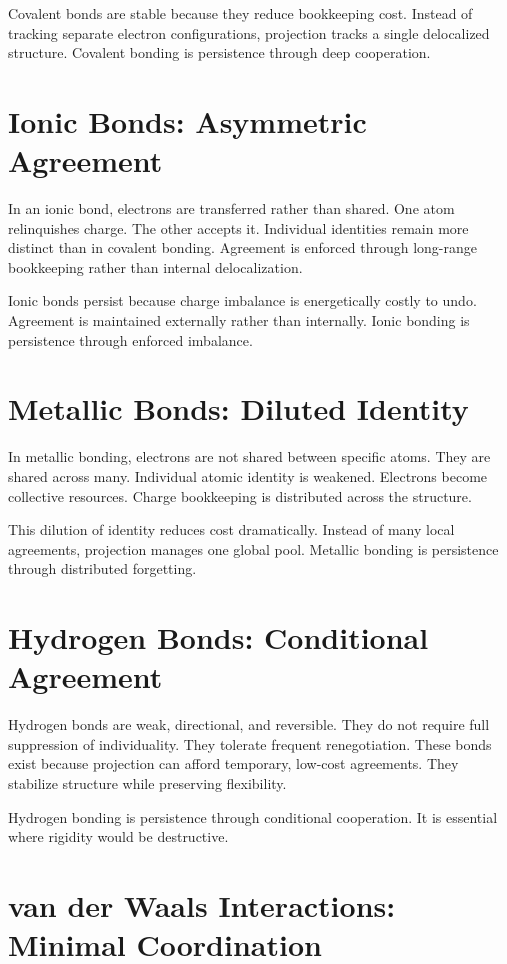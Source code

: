 \documentclass[11pt,twoside,openright]{book}
\begin{document}
Covalent bonds are stable because they reduce bookkeeping cost. Instead of tracking separate electron configurations, projection tracks a single delocalized structure. Covalent bonding is persistence through deep cooperation.

\section*{Ionic Bonds: Asymmetric Agreement}

In an ionic bond, electrons are transferred rather than shared. One atom relinquishes charge. The other accepts it. Individual identities remain more distinct than in covalent bonding. Agreement is enforced through long-range bookkeeping rather than internal delocalization.

Ionic bonds persist because charge imbalance is energetically costly to undo. Agreement is maintained externally rather than internally. Ionic bonding is persistence through enforced imbalance.

\section*{Metallic Bonds: Diluted Identity}

In metallic bonding, electrons are not shared between specific atoms. They are shared across many. Individual atomic identity is weakened. Electrons become collective resources. Charge bookkeeping is distributed across the structure.

This dilution of identity reduces cost dramatically. Instead of many local agreements, projection manages one global pool. Metallic bonding is persistence through distributed forgetting.

\section*{Hydrogen Bonds: Conditional Agreement}

Hydrogen bonds are weak, directional, and reversible. They do not require full suppression of individuality. They tolerate frequent renegotiation. These bonds exist because projection can afford temporary, low-cost agreements. They stabilize structure while preserving flexibility.

Hydrogen bonding is persistence through conditional cooperation. It is essential where rigidity would be destructive.

\section*{van der Waals Interactions: Minimal Coordination}
\end{document}
